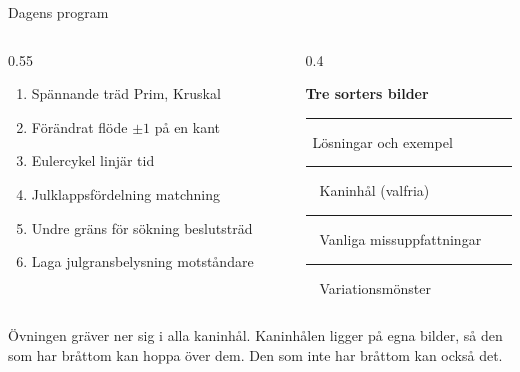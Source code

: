 \begin{frame}{Dagens program}
\begin{columns}[T]
\begin{column}{0.55\textwidth}
\begin{enumerate}\setlength{\itemsep}{3pt}
  \item Spännande träd \hfill{\scriptsize\color{black!55}Prim, Kruskal}
  \item Förändrat flöde \hfill{\scriptsize\color{black!55}$\pm1$ på en kant}
  \item Eulercykel \hfill{\scriptsize\color{black!55}linjär tid}
  \item Julklappsfördelning \hfill{\scriptsize\color{black!55}matchning}
  \item Undre gräns för sökning \hfill{\scriptsize\color{black!55}beslutsträd}
  \item Laga julgransbelysning \hfill{\scriptsize\color{black!55}motståndare}
\end{enumerate}
\end{column}
\begin{column}{0.4\textwidth}
\begin{infobox}[fontupper=\footnotesize]
\textbf{Tre sorters bilder}\par\smallskip
\textcolor{kthblue}{\rule[0.2ex]{1.2em}{1.2ex}}\ Lösningar och exempel\par
\textcolor{sand!90!bark}{\rule[0.2ex]{1.2em}{1.2ex}}\ \kaninikon\ Kaninhål (valfria)\par
\textcolor{brick}{\rule[0.2ex]{1.2em}{1.2ex}}\ \varningikon\ Vanliga missuppfattningar\par
\textcolor{kthgreen}{\rule[0.2ex]{1.2em}{1.2ex}}\ \ Variationsmönster
\end{infobox}
\end{column}
\end{columns}
\vfill
{\small Övningen gräver ner sig i alla kaninhål. Kaninhålen ligger på egna bilder,
så den som har bråttom kan hoppa över dem. Den som inte har bråttom kan också det.}
\vskip0.2cm
\end{frame}


